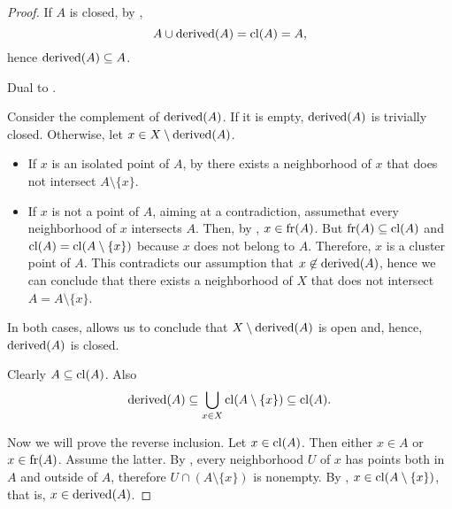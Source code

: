 \begin{proof}
  If \( A \) is closed, by ,
  \begin{equation*}
    A \cup \operatorname{derived}(A) = \operatorname{cl}(A) = A,
  \end{equation*}
  hence \( \operatorname{derived}(A) \subseteq A \).

   Dual to .

   Consider the complement of \( \operatorname{derived}(A) \). If it is empty, \( \operatorname{derived}(A) \) is trivially closed. Otherwise, let \( x \in X \setminus \operatorname{derived}(A) \).

  \begin{itemize}
    \item If \( x \) is an isolated point of \( A \), by  there exists a neighborhood of \( x \) that does not intersect \( A \setminus \{ x \} \).
    \item If \( x \) is not a point of \( A \), aiming at a contradiction, assume\DNE that every neighborhood of \( x \) intersects \( A \). Then, by , \( x \in \operatorname{fr}(A) \). But \( \operatorname{fr}(A) \subseteq \operatorname{cl}(A) \) and \( \operatorname{cl}(A) = \operatorname{cl}(A \setminus \{ x \}) \) because \( x \) does not belong to \( A \). Therefore, \( x \) is a cluster point of \( A \). This contradicts our assumption that \( x \not\in \operatorname{derived}(A) \), hence we can conclude that there exists a neighborhood of \( X \) that does not intersect \( A = A \setminus \{ x \} \).
  \end{itemize}

  In both cases,  allows us to conclude that \( X \setminus \operatorname{derived}(A) \) is open and, hence, \( \operatorname{derived}(A) \) is closed.

   Clearly \( A \subseteq \operatorname{cl}(A) \). Also
  \begin{equation*}
    \operatorname{derived}(A) \subseteq \bigcup_{x \in X} \operatorname{cl}(A \setminus \{ x \}) \subseteq \operatorname{cl}(A).
  \end{equation*}

  Now we will prove the reverse inclusion. Let \( x \in \operatorname{cl}(A) \). Then either \( x \in A \) or \( x \in \operatorname{fr}(A) \). Assume the latter. By , every neighborhood \( U \) of \( x \) has points both in \( A \) and outside of \( A \), therefore \( U \cap (A \setminus \{ x \}) \) is nonempty. By , \( x \in \operatorname{cl}(A \setminus \{ x \}) \), that is, \( x \in \operatorname{derived}(A) \).


\end{proof}
